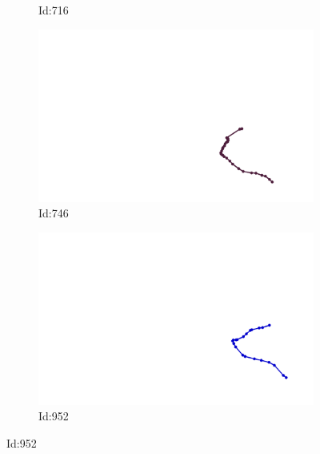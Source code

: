 \documentclass[12pt,twoside]{report}
\begin{document}
\begin{figure}
\begin{subfigure}[b]{0.20\textwidth}
\caption{Id:716}
\end{subfigure}
\begin{subfigure}[b]{0.20\textwidth}
\centering
\includegraphics[width=\textwidth]{../../trajectories/746.png}
\caption{Id:746}
\end{subfigure}
\begin{subfigure}[b]{0.20\textwidth}
\centering
\includegraphics[width=\textwidth]{../../trajectories/952.png}
\caption{Id:952}
\end{subfigure}
\end{figure}
\end{document}
